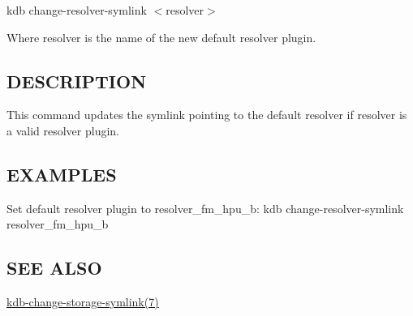 {\ttfamily kdb change-\/resolver-\/symlink $<$resolver$>$}

Where {\ttfamily resolver} is the name of the new default resolver plugin.

\subsection*{D\+E\+S\+C\+R\+I\+P\+T\+I\+ON}

This command updates the symlink pointing to the default resolver if {\ttfamily resolver} is a valid resolver plugin.

\subsection*{E\+X\+A\+M\+P\+L\+ES}

Set default resolver plugin to resolver\+\_\+fm\+\_\+hpu\+\_\+b\+: {\ttfamily kdb change-\/resolver-\/symlink resolver\+\_\+fm\+\_\+hpu\+\_\+b}

\subsection*{S\+EE A\+L\+SO}


\begin{DoxyItemize}
\item \hyperlink{md_doc_help_kdb-change-storage-symlink_doc_help_kdb-change-storage-symlink_md}{kdb-\/change-\/storage-\/symlink(7)} 
\end{DoxyItemize}